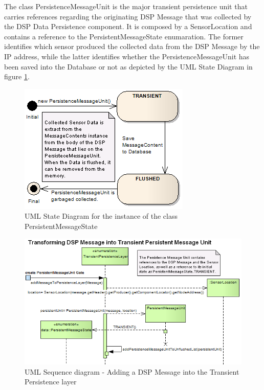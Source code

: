 The class PersistenceMessageUnit is the major transient persistence unit that
carries references regarding the originating DSP Message that was collected by
the DSP Data Persistence component. It is composed by a SensorLocation and
contains a reference to the PersistentMessageState enumaration. The former
identifies which sensor produced the collected data from the DSP Message by the
IP address, while the latter identifies whether the PersistenceMessageUnit has
been saved into the Database or not as depicted by the UML State Diagram
\cite{uml} in figure \ref{fig:PersistentMessageState-Diagram}.

\begin{figure}[!b]
  \centering
  \includegraphics[scale=0.5]{../diagrams/PersistentMessageState-Diagram}
  \caption{UML State Diagram for the instance of the class
  PersistentMessageState}
  \label{fig:PersistentMessageState-Diagram}
\end{figure}

\begin{figure}[!b]
  \centering
  \includegraphics[scale=0.5]{../diagrams/From-Create-PersistentMessageUnit-to-TransientPersistence-Layer-Sequence}
  \caption{UML Sequence diagram - Adding a DSP Message into the Transient Persistence layer}
  \label{fig:From-Create-PersistentMessageUnit-to-TransientPersistence-Layer-Sequence}
\end{figure}

